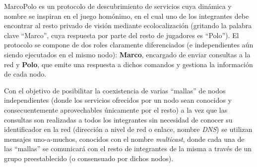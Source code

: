 MarcoPolo es un protocolo de descubrimiento de servicios cuya dinámica y nombre se inspiran en el juego homónimo\citationneeded, en el cual uno de los integrantes debe encontrar al resto privado de visión mediante ecolocalización (gritando la palabra clave ``Marco'', cuya respuesta por parte del resto de jugadores es ``Polo''). El protocolo se compone de dos roles claramente diferenciados (e independientes aún siendo ejecutados en el mismo nodo): \textbf{Marco}, encargado de enviar consultas a la red y \textbf{Polo}, que emite una respuesta a dichos comandos y gestiona la información de cada nodo. %

Con el objetivo de posibilitar la coexistencia de varias ``mallas'' de nodos independientes (donde los servicios ofrecidos por un nodo sean conocidos y consecuentemente aprovechables únicamente por el resto) a la vez que las consultas son realizadas a todos los integrantes sin necesidad de conocer su identificador en la red (dirección a nivel de red o enlace, nombre \textit{DNS}) se utilizan mensajes uno-a-muchos, conocidos con el nombre \textit{multicast}, donde cada una de las ``mallas'' se comunicará con el resto de integrantes de la misma a través de un grupo preestablecido (o consensuado por dichos nodos).

